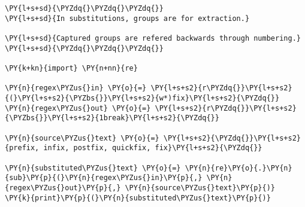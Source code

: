 

\section*{}

\begin{Verbatim}[commandchars=\\\{\}]
\PY{l+s+sd}{\PYZdq{}\PYZdq{}\PYZdq{}}
\PY{l+s+sd}{In substitutions, groups are for extraction.}

\PY{l+s+sd}{Captured groups are refered backwards through numbering.}
\PY{l+s+sd}{\PYZdq{}\PYZdq{}\PYZdq{}}

\PY{k+kn}{import} \PY{n+nn}{re}

\PY{n}{regex\PYZus{}in} \PY{o}{=} \PY{l+s+s2}{r\PYZdq{}}\PY{l+s+s2}{(}\PY{l+s+s2}{\PYZbs{}}\PY{l+s+s2}{w*)fix}\PY{l+s+s2}{\PYZdq{}}
\PY{n}{regex\PYZus{}out} \PY{o}{=} \PY{l+s+s2}{r\PYZdq{}}\PY{l+s+s2}{\PYZbs{}}\PY{l+s+s2}{1break}\PY{l+s+s2}{\PYZdq{}}

\PY{n}{source\PYZus{}text} \PY{o}{=} \PY{l+s+s2}{\PYZdq{}}\PY{l+s+s2}{prefix, infix, postfix, quickfix, fix}\PY{l+s+s2}{\PYZdq{}}

\PY{n}{substituted\PYZus{}text} \PY{o}{=} \PY{n}{re}\PY{o}{.}\PY{n}{sub}\PY{p}{(}\PY{n}{regex\PYZus{}in}\PY{p}{,} \PY{n}{regex\PYZus{}out}\PY{p}{,} \PY{n}{source\PYZus{}text}\PY{p}{)}
\PY{k}{print}\PY{p}{(}\PY{n}{substituted\PYZus{}text}\PY{p}{)}
\end{Verbatim}
